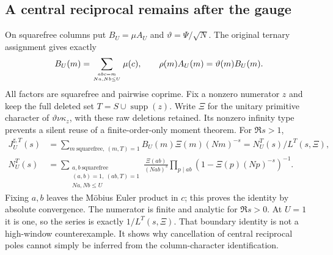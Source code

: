 \subsection{A central reciprocal remains after the gauge}
On squarefree columns put $B_U=\mu A_U$ and
$\vartheta=\Psi/\sqrt N$. The original ternary assignment gives exactly
\[
 B_U(m)=\sum_{abc=m\atop Na,Nb\le U}\mu(c),\qquad
 \rho(m)A_U(m)=\vartheta(m)B_U(m).
\]
All factors are squarefree and pairwise coprime. Fix a nonzero numerator
$z$ and keep the full deleted set $T=S\cup\operatorname{supp}(z)$.
Write $\Xi$ for the unitary primitive character of
$\vartheta\nu\kappa_z$, with these raw deletions retained.
Its nonzero infinity type prevents a silent reuse of a finite-order-only
moment theorem. For $\Re s>1$,
\begin{align*}
 J_U^{\sharp,T}(s)&=\sum_{m\ \mathrm{squarefree},\ (m,T)=1}
                   B_U(m)\Xi(m)(Nm)^{-s}=N_U^T(s)/L^T(s,\Xi),\\
 N_U^T(s)&=\sum_{\substack{a,b\ \mathrm{squarefree}\\(a,b)=1,\ (ab,T)=1\\Na,Nb\le U}}
 \frac{\Xi(ab)}{(Nab)^s}\prod_{p\mid ab}(1-\Xi(p)(Np)^{-s})^{-1}.
\end{align*}
Fixing $a,b$ leaves the M\"obius Euler product in $c$; this proves the
identity by absolute convergence. The numerator is finite and analytic
for $\Re s>0$. At $U=1$ it is one, so the series is exactly $1/L^T(s,\Xi)$.
That boundary identity is not a high-window counterexample. It shows why
cancellation of central reciprocal poles cannot simply be inferred from
the column-character identification.

